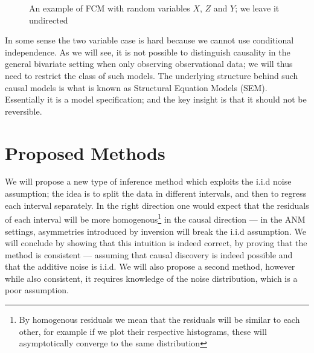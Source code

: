 \begin{figure}[!h]
    \centering

    \caption{An example of FCM with random variables $X$, $Z$ and $Y$; we leave it undirected}
    \label{fig:conditionalIndep}

\end{figure}

In some sense the two variable case is hard because we cannot use conditional independence. As we will see, 
it is not possible to distinguish causality in the general bivariate setting when only observing 
observational data; we will thus need to restrict 
the class of such models. The underlying structure behind such causal models is what is known as 
Structural Equation Models (SEM). Essentially 
it is a model specification; and the key insight is that it should not be reversible. 


\section{Proposed Methods}

We will propose a new type of inference method which exploits the i.i.d 
noise assumption; the idea is to split the data in different intervals, and then to regress each 
interval separately. In the right direction one would expect that the residuals of each 
interval will be more homogenous\footnote{By homogenous residuals we mean that the residuals will be similar 
to each other, for example if we plot their respective histograms, these will asymptotically converge to the 
same distribution} in the causal direction --- in the ANM settings, asymmetries introduced
by inversion will break the i.i.d assumption. We will conclude by 
showing that this intuition is indeed correct, by proving that the method is consistent --- 
assuming that causal discovery is indeed possible and that the additive noise is i.i.d. We will
also propose a second method, however while also consistent, it requires knowledge of the 
noise distribution, which is a poor assumption. 


